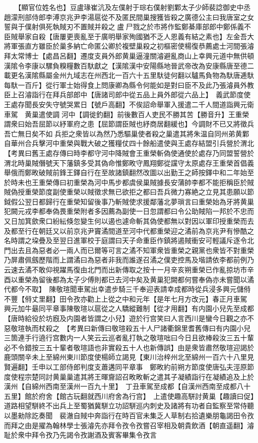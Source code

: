 　　【顯官位姓名也】豆盧瑑崔沆及左僕射于琮右僕射劉鄴太子少師裴諗御史中丞趙濛刑部侍郎李溥京兆尹李湯扈從不及匿民間巢搜獲皆殺之廣德公主曰我唐室之女誓與于僕射俱死執賊刃不置賊并殺之盧尸戮之於市將作監鄭綦庫部郎中鄭係義不臣賊舉家自殺【唐屢更喪亂至于廣明舉家殉國猶不乏人恩義有結之素也】左金吾大將軍張直方雖臣於巢多納亡命匿公卿於複壁巢殺之初樞密使楊復恭薦處士河間張濬拜太常博士【處昌呂翻】遷度支員外郎黄巢逼潼關濬避亂商山上幸興元道中無供頓漢隂令李康以騾負糗糧數百馱獻之【漢隂漢中安陽縣地晉武帝改為安康縣唐至德二載更名漢隂縣屬金州九域志在州西北一百六十五里馱徒何翻以驢馬負物為馱唐逓馱每馱一百斤】從行軍士始得食上問康卿為縣令何能如是對曰臣不及此乃張濬員外教臣上召濬詣行在拜兵部郎中【唐諸司郎中從五品上員外郎從六品上】　義武節度使王處存聞長安失守號哭累日【號戶高翻】不俟詔命舉軍入援遣二千人間道詣興元衛車駕　黄巢遣使調河中【調徙釣翻】前後數百人吏民不勝其苦【勝音升】王重榮謂衆曰始吾屈節以紓軍府之患【屈節謂臣賊也紓商居翻緩也】今調財不已又將徵兵吾亡無日矣不如兵拒之衆皆以為然乃悉驅巢使者殺之巢遣其將朱温自同州弟黄鄴自華州合兵擊河中重榮與戰大破之獲糧仗四十餘船遣使與王處存結盟引兵營於渭北　【考異曰舊王處存傳曰時李都守河中降賊會王重榮斬偽使通使於處存乃同盟誓營於渭北時巢賊僭號天下藩鎮多受其偽命惟鄭畋守鳳翔鄭從讜守太原處存王重榮首倡義舉俄而鄭畋破賊前鋒王鐸自行在至故諸鎮翻然改圖以出勤王之師按鐸中和二年始至於時未也王重榮傳曰初重榮為河中馬步都虞侯巢賊據長安蒲帥李都不能拒稱臣於賊賊偽授重榮節度副使重榮以賊徵求無已欲拒之都曰吾兵微力寡絶之立見其患願以節鉞假公翌日都歸行在重榮知留後事乃斬賊使求援鄰藩北夢瑣言曰重榮始為牙將黄巢犯闕元戎李都奉偽畏重榮附者多因薦為副使一日忽謂都曰令公助賊陷一邦於不忠而又日加箕歛衆口紛紜倏忽變生何以遏也遽命斬其偽使都無以對因以軍印授重榮而去及都至行在朝廷又以前京兆尹竇潏間道至河中代都重榮迎之潏前為京兆尹有慘酷之名時謂之垜疊及至翌日進軍校于庭謂曰天子命重臣作鎮將遏賊衝安可輕議斥逐令北門出去且為惡者必一兩人而已爾等可言之潏不知軍衆皆重榮之親黨也衆皆不對重榮乃屏肅佩劔歷階而上謂潏曰為惡者非我而誰遂召潏之僕吏控馬及堦請依李都前例乃云速去潏不敢仰視躍馬復由北門而出新傳取之按十一月辛亥朔重榮已作亂掠坊市辛酉以重榮為留後都為太子少傅則都已去河中矣及黄巢犯闕都何嘗奉偽亦未嘗聞以潏代都今不取】　陳敬瑄聞車駕出幸遣步騎三千奉迎表請幸成都時從兵浸多興元儲偫不豐【偫丈里翻】田令孜亦勸上上從之中和元年【是年七月方改元】春正月車駕興元加牛朂同平章事陳敬瑄以扈從之人驕縱難制【從才用翻】有内園小兒先至成都【唐時給役於坊廐及内園者皆謂之小兒】遊於行宫笑曰人言西川是蠻今日觀之亦不惡敬瑄執而杖殺之　【考異曰新傳曰敬瑄殺五十人尸諸衢錦里耆舊傳曰有内園小兒三箇連手行遶行宫數内一人笑云云巡者亂打執之敬瑄咄曰今日且欲棒殺汝三五十輩必不令錯按三五十輩者敬瑄語也非實殺五十人也新傳誤】由是衆皆肅然敬瑄迎謁於鹿頭關辛未上至綿州東川節度使楊師立謁見【東川治梓州北至綿州一百六十八里見賢遍翻】壬申以工部侍郎判度支蕭遘同平章事　鄭畋約前朔方節度使唐弘夫涇原節度使程宗楚同討黄巢巢遣其將王暉齎詔召畋畋斬之遣其子凝績詣行在凝績追及上於漢州【自綿州西南至漢州一百九十里】　丁丑車駕至成都【自漢州西南至成都八十五里】館於府舍【館古玩翻就西川府舍為行宫】　上遣使趣高駢討黄巢【趣讀曰促】道路相望駢終不出兵上至蜀猶冀駢立功詔駢巡内刺史及諸將有功者自監察至常侍聽以墨勑除訖奏聞　裴澈自賊中奔詣行在時百官未集乏人草制右拾遺樂朋龜謁田令孜而拜之由是擢為翰林學士張濬先亦拜令孜令孜嘗召宰相及朝貴飲酒【朝直遥翻】濬耻於衆中拜令孜乃先謁令孜謝酒及賓客畢集令孜言